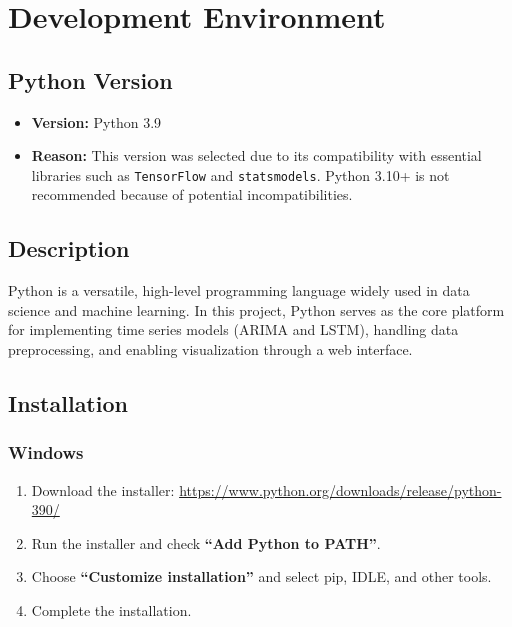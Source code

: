 %
%
%

\chapter{Development Environment}

\section{Python Version}

\begin{itemize}
	\item \textbf{Version:} Python 3.9
	\item \textbf{Reason:} This version was selected due to its compatibility with essential libraries such as \texttt{TensorFlow} and \texttt{statsmodels}. Python 3.10+ is not recommended because of potential incompatibilities.
\end{itemize}

\section{Description}

Python is a versatile, high-level programming language widely used in data science and machine learning. In this project, Python serves as the core platform for implementing time series models (ARIMA and LSTM), handling data preprocessing, and enabling visualization through a web interface.

\section{Installation}

\subsection*{Windows}

\begin{enumerate}
	\item Download the installer: \url{https://www.python.org/downloads/release/python-390/}
	\item Run the installer and check \textbf{``Add Python to PATH''}.
	\item Choose \textbf{``Customize installation''} and select pip, IDLE, and other tools.
	\item Complete the installation.
\end{enumerate}

